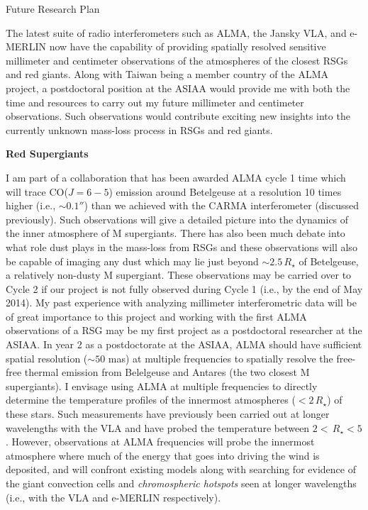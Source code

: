 \documentclass[11pt]{letter} %
\begin{document}
{\Large 
\begin{center}
Future Research Plan
\end{center}
}
The latest suite of radio interferometers such as ALMA, the Jansky VLA, and e-MERLIN now have the capability of providing spatially resolved sensitive millimeter and centimeter observations of the atmospheres of the closest RSGs and red giants. Along with Taiwan being a member country of the ALMA project, a postdoctoral position at the ASIAA would provide me with both the time and resources to carry out my future millimeter and centimeter observations. Such observations would contribute exciting new insights into the currently unknown mass-loss process in RSGs and red giants. 
\begin{center}
\textbf{Red Supergiants}
\end{center}
I am part of a collaboration that has been awarded ALMA cycle 1 time which will trace CO($J=6-5$) emission around Betelgeuse at a resolution 10 times higher (i.e., $\sim 0.1''$) than we achieved with the CARMA interferometer (discussed previously). Such observations will give a detailed picture into the dynamics of the inner atmosphere of M supergiants. There has also been much debate into what role dust plays in the mass-loss from RSGs and these observations will also be capable of imaging any dust which may lie just beyond $\sim 2.5\,R_{\star}$ of Betelgeuse, a relatively non-dusty M supergiant. These observations may be carried over to Cycle 2 if our project is not fully observed during Cycle 1 (i.e., by the end of May 2014). My past experience with analyzing millimeter interferometric data will be of great importance to this project and working with the first ALMA observations of a RSG may be my first project as a postdoctoral researcher at the ASIAA. In year 2 as a postdoctorate at the ASIAA, ALMA should have sufficient spatial resolution ($\sim 50$ mas) at multiple frequencies to spatially resolve the free-free thermal emission from Belelgeuse and Antares (the two closest M supergiants). I envisage using ALMA at multiple frequencies to directly determine the temperature profiles of the  innermost atmospheres ($<2\,R_{\star}$) of these stars. Such measurements have previously been carried out at longer wavelengths with the VLA and have probed the temperature between $2 < \,R_{\star} < 5$. However, observations at ALMA frequencies will probe the innermost atmosphere where much of the energy that goes into driving the wind is deposited, and will confront existing models along with searching for evidence of the giant convection cells and \textit{chromospheric hotspots} seen at longer wavelengths (i.e., with the VLA and e-MERLIN respectively).
\end{document}
